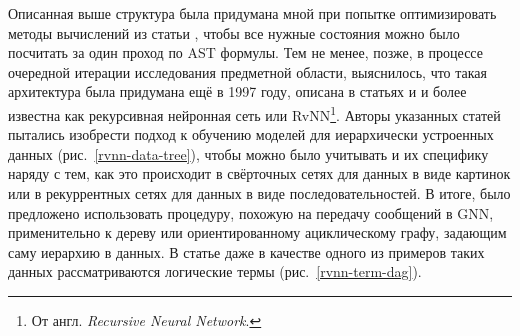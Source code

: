 Описанная выше структура была придумана мной при попытке оптимизировать методы вычислений из статьи \cite{gnn-for-scheduling-paper}, чтобы все нужные состояния можно было посчитать за один проход по AST формулы. Тем не менее, позже, в процессе очередной итерации исследования предметной области, выяснилось, что такая архитектура была придумана ещё в 1997 году, описана в статьях \cite{rvnn-intro-paper} и \cite{rvnn-intro-paper-2} и более известна как рекурсивная нейронная сеть или RvNN\footnote{От англ. \textit{Recursive Neural Network}.}. Авторы указанных статей пытались изобрести подход к обучению моделей для иерархически устроенных данных (рис.~\ref{rvnn-data-tree}), чтобы можно было учитывать и их специфику наряду с тем, как это происходит в свёрточных сетях для данных в виде картинок или в рекуррентных сетях для данных в виде последовательностей. В итоге, было предложено использовать процедуру, похожую на передачу сообщений в GNN, применительно к дереву или ориентированному ациклическому графу, задающим саму иерархию в данных. В статье даже в качестве одного из примеров таких данных рассматриваются логические термы (рис.~\ref{rvnn-term-dag}).

